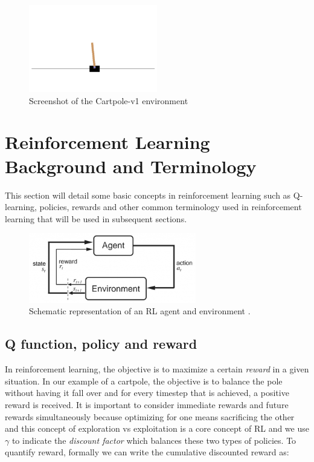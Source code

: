 \documentclass[acmsmall,review,authorversion]{acmart}
\begin{document}
    \begin{figure}[ht]
        \centering
        \includegraphics[width=0.5\textwidth]{assets/cartpole.png}
        \caption{Screenshot of the Cartpole-v1 environment}
        \label{fig:cartpole}
    \end{figure}

\section{Reinforcement Learning Background and Terminology}
\label{section:rl_background}
This section will detail some basic concepts in reinforcement learning such as Q-learning, policies, rewards and other common terminology used in reinforcement learning that will be used in subsequent sections.

    \begin{figure}[ht]
        \centering
        \includegraphics[width=0.65\textwidth]{assets/rl_schematic.png}
        \caption{Schematic representation of an RL agent and environment \cite{sutton1992reinforcement}.}
        \label{fig:agent_env}
    \end{figure}

\subsection{Q function, policy and reward}
\label{sub:qfunction}
In reinforcement learning, the objective is to maximize a certain \emph{reward} in a given situation. In our example of a cartpole, the objective is to balance the pole without having it fall over and for every timestep that is achieved, a positive reward is received. It is important to consider immediate rewards and future rewards simultaneously because optimizing for one means sacrificing the other and this concept of exploration vs exploitation is a core concept of RL and we use $\gamma$ to indicate the \emph{discount factor} which balances these two types of policies. To quantify reward, formally we can write the cumulative discounted reward as:
\end{document}
